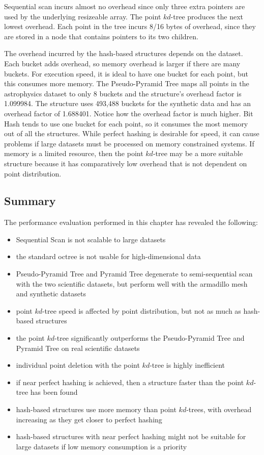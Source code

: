 Sequential scan incurs almost no overhead since only three extra pointers are used by the underlying resizeable array. The point $kd$-tree produces the next lowest overhead. Each point in the tree incurs 8/16 bytes of overhead, since they are stored in a node that contains pointers to its two children. 

The overhead incurred by the hash-based structures depends on the dataset. Each bucket adds overhead, so memory overhead is larger if there are many buckets. For execution speed, it is ideal to have one bucket for each point, but this consumes more memory. The Pseudo-Pyramid Tree maps all points in the astrophysics dataset to only 8 buckets and the structure's overhead factor is 1.099984. The structure uses 493,488 buckets for the synthetic data and has an overhead factor of 1.688401. Notice how the overhead factor is much higher. Bit Hash tends to use one bucket for each point, so it consumes the most memory out of all the structures. While perfect hashing is desirable for speed, it can cause problems if large datasets must be processed on memory constrained systems. If memory is a limited resource, then the point $kd$-tree may be a more suitable structure because it has comparatively low overhead that is not dependent on point distribution.

\subsection{Summary}

The performance evaluation performed in this chapter has revealed the following:
\begin{itemize}
	\item Sequential Scan is not scalable to large datasets
	\item the standard octree is not usable for high-dimensional data
	\item Pseudo-Pyramid Tree and Pyramid Tree degenerate to semi-sequential scan with the two scientific datasets, but perform well with the armadillo mesh and synthetic datasets
	\item point $kd$-tree speed is affected by point distribution, but not as much as hash-based structures
	\item the point $kd$-tree significantly outperforms the Pseudo-Pyramid Tree and Pyramid Tree on real scientific datasets
	\item individual point deletion with the point $kd$-tree is highly inefficient
	\item if near perfect hashing is achieved, then a structure faster than the point $kd$-tree has been found
	\item hash-based structures use more memory than point $kd$-trees, with overhead increasing as they get closer to perfect hashing
	\item hash-based structures with near perfect hashing might not be suitable for large datasets if low memory consumption is a priority
\end{itemize}

